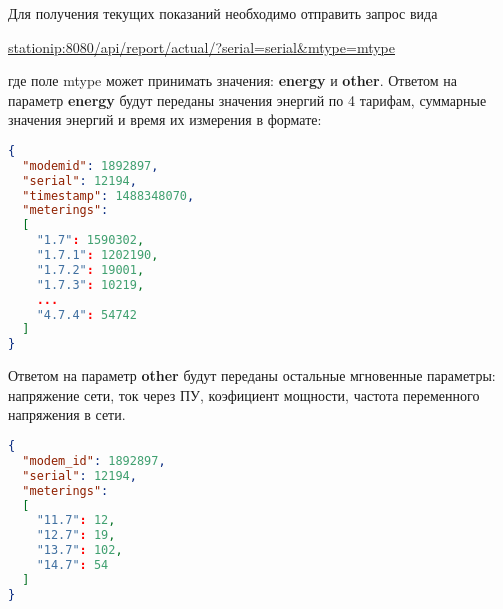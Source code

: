Для получения текущих показаний необходимо отправить запрос вида 
\smallskip

\url{stationip:8080/api/report/actual/?serial=serial&mtype=mtype}
\smallskip

где поле mtype может принимать значения: \textbf{energy} и \textbf{other}. 
Ответом на параметр \textbf{energy} будут переданы значения энергий по 4 тарифам, суммарные значения энергий и время их измерения в формате:

\bigskip

\begin{lstlisting}[language=json,firstnumber=1]
{
  "modemid": 1892897,
  "serial": 12194,
  "timestamp": 1488348070,
  "meterings":
  [
    "1.7": 1590302,
    "1.7.1": 1202190,
    "1.7.2": 19001,
    "1.7.3": 10219,
    ...
    "4.7.4": 54742
  ]
}
\end{lstlisting}

Ответом на параметр \textbf{other} будут переданы остальные мгновенные параметры: напряжение сети, ток через ПУ, коэфициент мощности, частота переменного напряжения в сети.

\bigskip

\begin{lstlisting}[language=json,firstnumber=1]
{
  "modem_id": 1892897,
  "serial": 12194,
  "meterings": 
  [
    "11.7": 12,
    "12.7": 19,
    "13.7": 102,
    "14.7": 54
  ]
}
\end{lstlisting}
